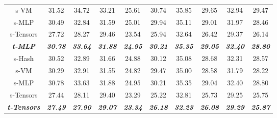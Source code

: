 \documentclass[letterpaper]{article} \usepackage{aaai23}  \usepackage{times}  \usepackage{helvet}  \usepackage{courier}  \usepackage[hyphens]{url}  \usepackage{graphicx} \urlstyle{rm} \def\UrlFont{\rm}  \usepackage{natbib}  \usepackage{caption} \frenchspacing  \setlength{\pdfpagewidth}{8.5in}  \setlength{\pdfpageheight}{11in}  \usepackage{multirow}
\begin{document}
\begin{table*}[t]
{\begin{tabular}{c|ccccccccc}
s-VM                        & 31.52                   & 34.72                   & 33.21                   & 25.61                   & 30.74                   & 35.85                   & 29.65                   & 32.94                   & 29.47                   \\
s-MLP                       & 30.49                   & 32.84                   & 31.59                   & 25.01                   & 29.94                   & 35.11                   & 29.01                   & 31.97                   & 28.46                   \\
s-Tensors                   & 27.72                   & 28.27                   & 29.46                   & 23.54                   & 25.94                   & 32.64                   & 26.42                   & 29.37                   & 26.14                   \\ \hline
\textit{\textbf{t-MLP}}     & \textit{\textbf{30.78}} & \textit{\textbf{33.64}} & \textit{\textbf{31.88}} & \textit{\textbf{24.95}} & \textit{\textbf{30.21}} & \textit{\textbf{35.35}} & \textit{\textbf{29.05}} & \textit{\textbf{32.40}} & \textit{\textbf{28.80}} \\ \hline
s-Hash                      & 30.52                   & 32.89                   & 31.66                   & 24.88                   & 30.12                   & 35.08                   & 28.68                   & 32.31                   & 28.57                   \\
s-VM                        & 30.29                   & 32.91                   & 31.55                   & 24.82                   & 29.47                   & 35.00                   & 28.58                   & 31.79                   & 28.22                   \\
s-MLP                       & 30.78                   & 33.63                   & 31.88                   & 24.95                   & 30.21                   & 35.35                   & 29.04                   & 32.40                   & 28.80                   \\
s-Tensors                   & 27.44                   & 28.11                   & 29.40                   & 23.29                   & 25.22                   & 32.81                   & 25.73                   & 29.25                   & 25.75                   \\ \hline
\textit{\textbf{t-Tensors}} & \textit{\textbf{27.49}} & \textit{\textbf{27.90}} & \textit{\textbf{29.07}} & \textit{\textbf{23.34}} & \textit{\textbf{26.18}} & \textit{\textbf{32.23}} & \textit{\textbf{26.08}} & \textit{\textbf{29.29}} & \textit{\textbf{25.87}} \\ \hline

\end{tabular}}
\end{table*}
\end{document}
